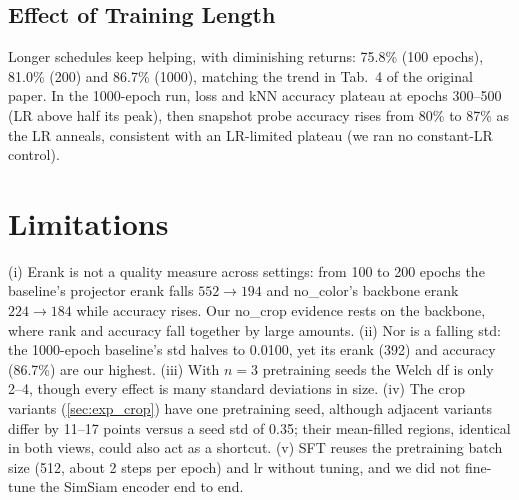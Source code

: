 \documentclass[10pt,twocolumn,letterpaper]{article}
\begin{document}

\subsection{Effect of Training Length}
\label{sec:exp_length}


Longer schedules keep helping, with diminishing returns: 75.8\% (100 epochs), 81.0\% (200) and 86.7\% (1000), matching the trend in Tab.~4 of the original paper.
In the 1000-epoch run, loss and kNN accuracy plateau at epochs 300--500 (LR above half its peak), then snapshot probe accuracy rises from 80\% to 87\% as the LR anneals, consistent with an LR-limited plateau (we ran no constant-LR control).

\section{Limitations}
\label{sec:limitations}

(i) Erank is not a quality measure across settings: from 100 to 200 epochs the baseline's projector erank falls $552\to194$ and no\_color's backbone erank $224\to184$ while accuracy rises. Our no\_crop evidence rests on the backbone, where rank and accuracy fall together by large amounts.
(ii) Nor is a falling std: the 1000-epoch baseline's std halves to 0.0100, yet its erank (392) and accuracy (86.7\%) are our highest.
(iii) With $n{=}3$ pretraining seeds the Welch df is only 2--4, though every effect is many standard deviations in size.
(iv) The crop variants (\cref{sec:exp_crop}) have one pretraining seed, although adjacent variants differ by 11--17 points versus a seed std of 0.35; their mean-filled regions, identical in both views, could also act as a shortcut.
(v) SFT reuses the pretraining batch size (512, about 2 steps per epoch) and lr without tuning, and we did not fine-tune the SimSiam encoder end to end.
\end{document}

